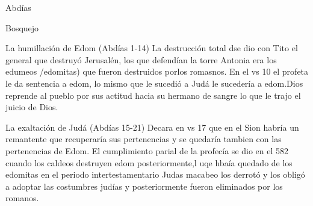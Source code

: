 \documentclass[12pt]{article}
\begin{document}
\begin{section}{Abdías}
\begin{subsection}{Bosquejo}
\begin{subsubsection}{La humillación de Edom (Abdías 1-14)}
			La destrucción total dse dio con Tito el general que destruyó Jerusalén, los que defendían la torre Antonia era los edumeos /edomitas) que fueron destruidos porlos romasnos. En el vs 10 el profeta le da sentencia a edom, lo mismo que le sucedió a Judá le sucedería a edom.Dios reprende al pueblo por sus actitud hacia su hermano de sangre lo que le trajo el juicio de Dios.
		\end{subsubsection}
		\begin{subsubsection}{La exaltación de Judá (Abdías 15-21)}
			Decara en vs 17 que en el Sion habría un remantente que recuperaría sus pertenencias y se quedaría tambien con las pertenencias de Edom. El cumplimiento parial de la profecía se dio en el 582 cuando los caldeos destruyen edom posteriormente,l uqe hbaía quedado de los edomitas en el periodo intertestamentario Judas macabeo los derrotó y los obligó a adoptar las costumbres judías y posteriormente fueron eliminados por los romanos.
		\end{subsubsection}
	\end{subsection}
\end{section}
\end{document}
